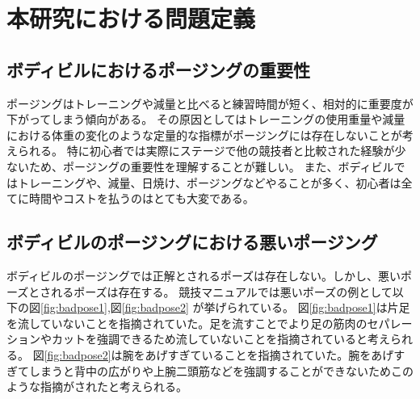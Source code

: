 \chapter{本研究における問題定義}
\label{issue}

\section{ボディビルにおけるポージングの重要性}
ポージングはトレーニングや減量と比べると練習時間が短く、相対的に重要度が下がってしまう傾向がある。
その原因としてはトレーニングの使用重量や減量における体重の変化のような定量的な指標がポージングには存在しないことが考えられる。
特に初心者では実際にステージで他の競技者と比較された経験が少ないため、ポージングの重要性を理解することが難しい。
また、ボディビルではトレーニングや、減量、日焼け、ポージングなどやることが多く、初心者は全てに時間やコストを払うのはとても大変である。
\section{ボディビルのポージングにおける悪いポージング}
ボディビルのポージングでは正解とされるポーズは存在しない。しかし、悪いポーズとされるポーズは存在する。
競技マニュアル\cite{JBBF2023}では悪いポーズの例として以下の図\ref{fig:badpose1},図\ref{fig:badpose2} が挙げられている。
図\ref{fig:badpose1}は片足を流していないことを指摘されていた。足を流すことでより足の筋肉のセパレーションやカットを強調できるため流していないことを指摘されていると考えられる。
図\ref{fig:badpose2}は腕をあげすぎていることを指摘されていた。腕をあげすぎてしまうと背中の広がりや上腕二頭筋などを強調することができないためこのような指摘がされたと考えられる。


